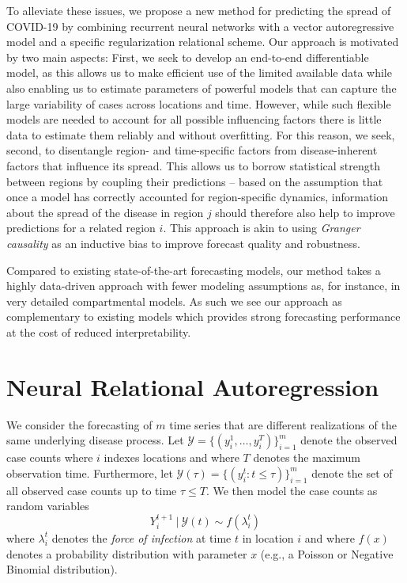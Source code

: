 \documentclass[nobib]{tufte-handout}
\newcommand{\Set}[1]{\mathcal{#1}}
\newcommand{\foi}{\lambda}
\begin{document}
To alleviate these issues, we propose a new method for predicting the spread of
COVID-19 by combining recurrent neural networks with a vector autoregressive
model and a specific regularization relational scheme. Our approach is motivated
by two main aspects: First, we seek to develop an end-to-end differentiable
model, as this allows us to make efficient use of the limited available data
while also enabling us to estimate parameters of powerful models that can capture
the large variability of cases across locations and time. However, while such
flexible models are needed to account for all possible influencing factors there
is little data to estimate them reliably and without overfitting. For this
reason, we seek, second, to disentangle region- and time-specific factors from
disease-inherent factors that influence its spread. This allows us to borrow
statistical strength between regions by coupling their predictions -- based on
the assumption that once a model has correctly accounted for region-specific
dynamics, information about the spread of the disease in region \(j\) should
therefore also help to improve predictions for a related region \(i\). This
approach is akin to using \emph{Granger causality} as an inductive bias to improve
forecast quality and robustness.

Compared to existing state-of-the-art forecasting models, our method takes a
highly data-driven approach with fewer modeling assumptions as, for instance, in
very detailed compartmental models. As such we see our approach as complementary
to existing models which provides strong forecasting performance at the cost of
reduced interpretability.


\section{Neural Relational Autoregression}
\label{sec:org914e4a2}
We consider the forecasting of \(m\) time series that are different realizations
of the same underlying disease process. Let \({\Set{Y} = \{(y_i^1, \ldots,
y_i^T)\}_{i=1}^m}\) denote the observed case counts where \(i\) indexes locations
and where \(T\) denotes the maximum observation time. Furthermore, let
\(\Set{Y}(\tau) = \{(y_i^t : t \leq \tau)\}_{i=1}^m\) denote the set of all
observed case counts up to time \(\tau \leq T\). We then model the case counts as
random variables
\begin{equation*}
    Y^{t+1}_i\ |\ \Set{Y}(t) \sim f(\foi_i^t)
\end{equation*}
where \(\foi_i^{t}\) denotes the \emph{force of infection} at time
\(t\) in location \(i\) and where \(f(x)\) denotes a probability distribution with
parameter \(x\) (e.g., a Poisson or Negative Binomial distribution).
\end{document}
